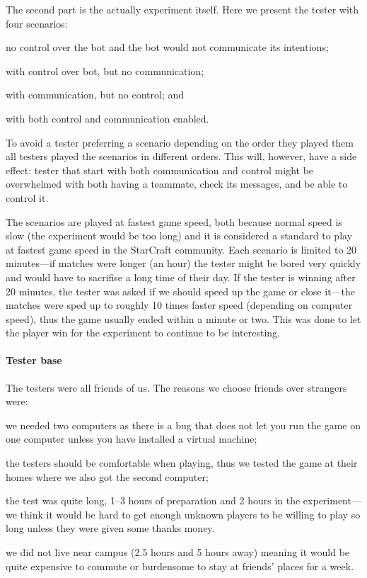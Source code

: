 The second part is the actually experiment itself. Here we present the tester with four scenarios:
\begin{inparaenum}[1\upshape)]
	\item no control over the bot and the bot would not communicate its intentions;
	\item with control over bot, but no communication;
	\item with communication, but no control; and
	\item with both control and communication enabled.
\end{inparaenum}
To avoid a tester preferring a scenario depending on the order they played them all testers played
the scenarios in different orders. This will, however, have a side effect: tester that start with both
communication and control might be overwhelmed with both having a teammate, check its messages, and
be able to control it.

The scenarios are played at fastest game speed, both because normal speed is slow (the experiment
would be too long) and it is considered a standard to play at fastest game speed in the StarCraft
community. Each scenario is limited to 20 minutes—if matches were longer (an hour) the tester might
be bored very quickly and would have to sacrifise a long time of their day. If the tester is winning
after 20 minutes, the tester was asked if we should speed up the game or close it—the matches were
sped up to roughly 10 times faster speed (depending on computer speed), thus the game usually ended
within a minute or two. This was done to let the player win for the experiment to continue to be
interesting.

\paragraph{Tester base}
The testers were all friends of us. The reasons we choose friends over strangers were:
\begin{inparaenum}[1\upshape)]
	\item we needed two computers as there is a bug that does not let you run the game on one computer
		unless you have installed a virtual machine;
	\item the testers should be comfortable when playing, thus we tested the game at their homes where
		we also got the second computer;
	\item the test was quite long, 1–3 hours of preparation and 2 hours in the experiment—we think it
		would be hard to get enough unknown players to be willing to play so long unless they were given
		some thanks money.
	\item we did not live near campus (2.5 hours and 5 hours away) meaning it would be quite expensive
		to commute or burdensome to stay at friends' places for a week.
\end{inparaenum}


